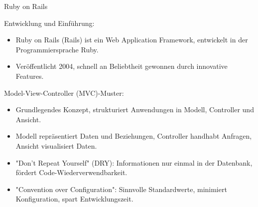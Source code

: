\documentclass{beamer}
\begin{document}
\begin{frame}{Ruby on Rails}

Entwicklung und Einführung:
  \begin{itemize}
    \item Ruby on Rails (Rails) ist ein Web Application Framework, entwickelt in der Programmiersprache Ruby.
    \item Veröffentlicht 2004, schnell an Beliebtheit gewonnen durch innovative Features.
  \end{itemize}


Model-View-Controller (MVC)-Muster:

  \begin{itemize}
    \item Grundlegendes Konzept, strukturiert Anwendungen in Modell, Controller und Ansicht.
    \item Modell repräsentiert Daten und Beziehungen, Controller handhabt Anfragen, Ansicht visualisiert Daten.
  \end{itemize}

  \begin{itemize}
    \item "Don't Repeat Yourself" (DRY): Informationen nur einmal in der Datenbank, fördert Code-Wiederverwendbarkeit.
    \item "Convention over Configuration": Sinnvolle Standardwerte, minimiert Konfiguration, spart Entwicklungszeit.
  \end{itemize}
\end{frame}
\end{document}
